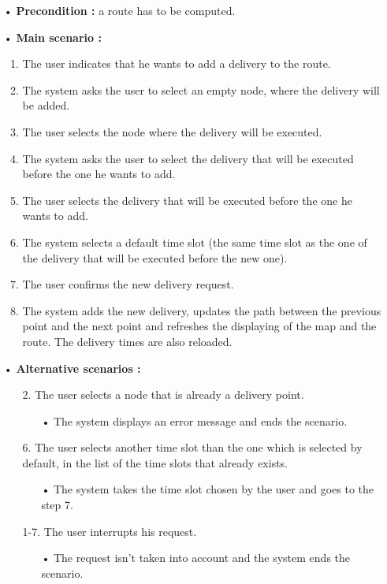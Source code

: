 \documentclass[paper=a4, fontsize=11pt]{report}
\numberwithin{equation}{section}		%
\numberwithin{figure}{section}		%
\numberwithin{table}{section}		%
\begin{document}
\begin{itemize}
  \item[•] \textbf{Precondition :} a route has to be computed.
  \item[•] \textbf{Main scenario :}
  \begin{enumerate}
    \item The user indicates that he wants to add a delivery to the route.
    \item The system asks the user to select an empty node, where the delivery will be added.
    \item The user selects the node where the delivery will be executed.
    \item The system asks the user to select the delivery that will be executed before the one he wants to add.
    \item The user selects the delivery that will be executed before the one he wants to add.
    \item The system selects a default time slot (the same time slot as the one of the delivery that will be executed before the new one).
    \item The user confirms the new delivery request.
    \item The system adds the new delivery, updates the path between the previous point and the next point and refreshes the displaying of the map and the route. The delivery times are also reloaded.
  \end{enumerate}
  \item[•] \textbf{Alternative scenarios :}
  \begin{itemize}
    \item[2.] The user selects a node that is already a delivery point.
    \begin{itemize}
      \item[•] The system displays an error message and ends the scenario.
    \end{itemize}
    \item[6.] The user selects another time slot than the one which is selected by default, in the list of the time slots that already exists.
    \begin{itemize}
      \item[•] The system takes the time slot chosen by the user and goes to the step 7.
    \end{itemize}
    \item[1-7.] The user interrupts his request.
    \begin{itemize}
      \item[•] The request isn’t taken into account and the system ends the scenario.
    \end{itemize}
  \end{itemize}
\end{itemize}
\end{document}
